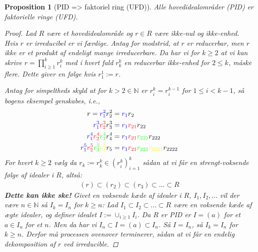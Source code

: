 \documentclass[10pt,twoside,openany,final]{memoir}
\makeatletter
\def\mathcolor#1#{\@mathcolor{#1}}
\def\@mathcolor#1#2#3{%
  \protect\leavevmode
  \begingroup
    \color#1{#2}#3%
  \endgroup
}
\theoremstyle{break}
\newtheorem{proposition}[section]{Proposition}
\theoremstyle{Break}
\newcommand{\N}{\mathbb{N}}
\makeatother
\begin{document}
\begin{proposition}[PID => faktoriel ring (UFD)]
Alle hovedidealområder (PID) er faktorielle ringe (UFD).
\begin{proof}
Lad $R$ være et hovedidealområde og $r \in R$ være ikke-nul og ikke-enhed. Hvis $r$ er irreducibel er vi færdige. Antag for modstrid, at $r$ er reducerbar, men $r$ ikke er et produkt af endeligt mange irreducerbare. Da har vi for $k \geq 2$ at vi kan skrive $r=\prod_{i \geq 1}^k r_i^{k}$ med i hvert fald $r_k^{k}$ en reducerbar ikke-enhed for $2 \leq k$, måske flere. Dette giver en følge hvis $r_1^1:=r$.

\noindent Antag for simpeltheds skyld at for $k> 2 \in \N$ er $r_i^k=r_i^{k-1}$ for $1 \leq i <k-1$, så bogens eksempel genskabes, i.e., 
\begin{align*}
r=\mathcolor{blue}{r_1^2}r_2^2&=\mathcolor{blue}{r_1}r_2\\
\mathcolor{blue}{r_1^3}\mathcolor{red}{r_{2}^3} r_{3}^3&= \mathcolor{blue}{r_1} \mathcolor{red}{r_{21}} r_{22}\\
\mathcolor{blue}{r_1^4}\mathcolor{red}{r_{2}^4} \mathcolor{green}{r_{3}^4} r_{4}^4&=\mathcolor{blue}{r_1} \mathcolor{red}{r_{21}} \mathcolor{green}{r_{221}}  r_{222}\\
\mathcolor{blue}{r_1^5}\mathcolor{red}{r_{2}^5} \mathcolor{green}{r_{3}^5} \mathcolor{yellow}{r_{4}^5}r_5&=\mathcolor{blue}{r_1} \mathcolor{red}{r_{21}} \mathcolor{green}{r_{221}}  \mathcolor{yellow}{r_{2221}}r_{2222}\\
\end{align*} For hvert $k \geq 2$ vælg da $r_k:=r_{k}^k \in (r^k_i)_{i=1}^k$ sådan at vi får en strengt-voksende følge af idealer i $R$, altså:
\begin{align*}
(r) \subset (r_2) \subset (r_3) \subset \dots \subset R
\end{align*}
\textbf{Dette kan ikke ske!} Givet en voksende kæde af idealer i $R$, $I_1,I_2,\dots$ vil der være $n\in \N$ så $I_k=I_n$ for $k \geq n$: Lad $I_1 \subset I_2 \subset \dots \subset R$ være en voksende kæde af ægte idealer, og definer idealet $I:=\cup_{i\geq 1} I_i$. Da $R$ er PID er $I=(a)$ for et $a \in I_n$ for et $n$. Men da har vi $I_n\subset I =(a) \subset I_n$. Så $I=I_n$, så $I_k = I_n$ for $k \geq n$. Derfor må processen ovenover terminerer, sådan at vi får en endelig dekomposition af $r$ ved irreducible.


\end{proof}
\end{proposition}
\end{document}
